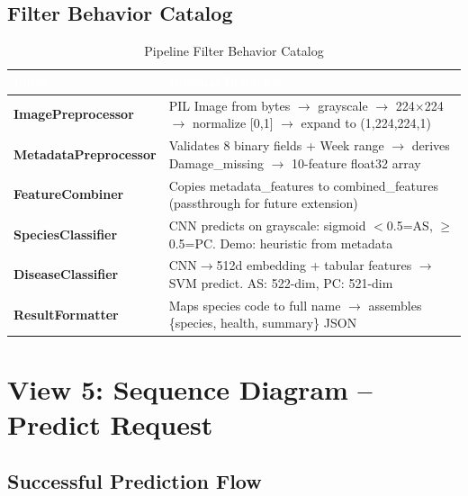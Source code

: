 \documentclass[11pt,a4paper,oneside]{report}
\begin{document}
\subsection{Filter Behavior Catalog}

\begin{table}[H]
\centering\footnotesize
\caption{Pipeline Filter Behavior Catalog}
\label{tab:filter-behavior}
\begin{tabularx}{\textwidth}{>{\bfseries\footnotesize}p{2.5cm} X}
\toprule
\rowcolor{tableheader}
\textcolor{white}{Filter} & \textcolor{white}{Internal Behavior} \\
\midrule
ImagePreprocessor    & PIL Image from bytes $\to$ grayscale $\to$ 224$\times$224 $\to$ normalize [0,1] $\to$ expand to (1,224,224,1) \\
MetadataPreprocessor & Validates 8 binary fields + Week range $\to$ derives Damage\_missing $\to$ 10-feature float32 array \\
FeatureCombiner      & Copies metadata\_features to combined\_features (passthrough for future extension) \\
SpeciesClassifier    & CNN predicts on grayscale: sigmoid $<$0.5=AS, $\geq$0.5=PC. Demo: heuristic from metadata \\
DiseaseClassifier    & CNN$\to$512d embedding + tabular features $\to$ SVM predict. AS: 522-dim, PC: 521-dim \\
ResultFormatter      & Maps species code to full name $\to$ assembles \{species, health, summary\} JSON \\
\bottomrule
\end{tabularx}
\end{table}


\newpage
\section{View 5: Sequence Diagram -- Predict Request}

\subsection{Successful Prediction Flow}
\end{document}
